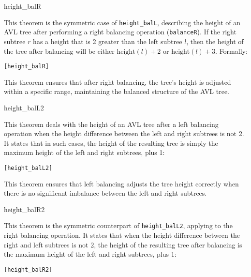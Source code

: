 \begin{thm}{height\_balR}

This theorem is the symmetric case of \texttt{height\_balL}, describing the height of an AVL tree after performing a right balancing operation (\texttt{balanceR}). If the right subtree \(r\) has a height that is 2 greater than the left subtree \(l\), then the height of the tree after balancing will be either \(\text{height}(l) + 2\) or \(\text{height}(l) + 3\). Formally:


\begin{alltt}
	[height_balR]
\end{alltt}

\end{thm}

This theorem ensures that after right balancing, the tree's height is adjusted within a specific range, maintaining the balanced structure of the AVL tree.


\begin{thm}{height\_balL2}

This theorem deals with the height of an AVL tree after a left balancing operation when the height difference between the left and right subtrees is not 2. It states that in such cases, the height of the resulting tree is simply the maximum height of the left and right subtrees, plus 1:


\begin{alltt}
	[height_balL2]
\end{alltt}

\end{thm}

This theorem ensures that left balancing adjusts the tree height correctly when there is no significant imbalance between the left and right subtrees.


\begin{thm}{height\_balR2}

This theorem is the symmetric counterpart of \texttt{height\_balL2}, applying to the right balancing operation. It states that when the height difference between the right and left subtrees is not 2, the height of the resulting tree after balancing is the maximum height of the left and right subtrees, plus 1:


\begin{alltt}
	[height_balR2]
\end{alltt}


\end{thm}

